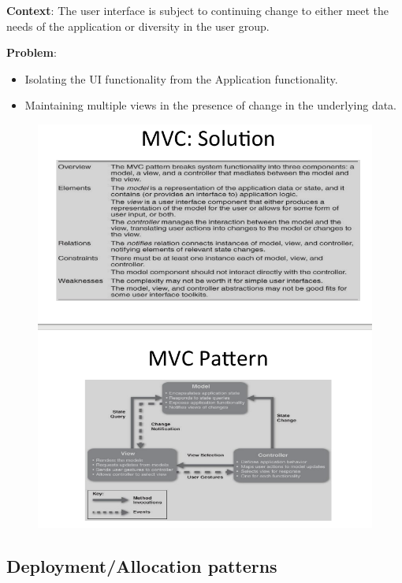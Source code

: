 \documentclass[a4paper]{article}
\begin{document}
\textbf{Context}: The user interface is subject to continuing change to either
meet the needs of the application or diversity in the user group.

\textbf{Problem}:
\begin{itemize}
\item
  Isolating the UI functionality from the Application functionality.
\item
  Maintaining multiple views in the presence of change in the underlying data.
\end{itemize}


\begin{figure}[H]
\centering
  \includegraphics[width=1\linewidth]
  {images/mvc.png}
\end{figure}

\subsection{Deployment/Allocation patterns}

\end{document}
